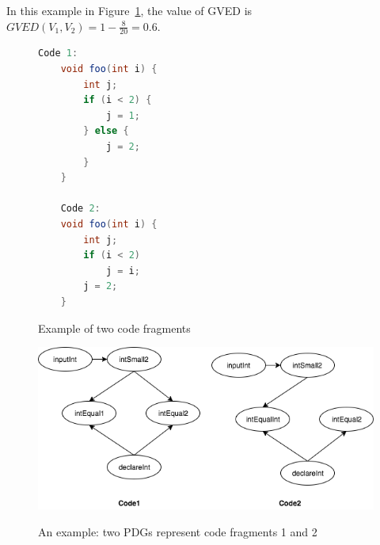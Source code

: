 In this example in Figure~\ref{code1code2}, the value of GVED is
$GVED\left(V_1, V_2\right) = 1 - \frac{8 }{20} = 0.6 $.

\begin{figure}
\begin{lstlisting}[language=JAVA]
	Code 1:
	void foo(int i) {
		int j;
		if (i < 2) {
			j = 1;
		} else {
			j = 2;
		}
	}

	Code 2:
	void foo(int i) {
		int j;
		if (i < 2)
			j = i;	
		j = 2;
	}
\end{lstlisting}
\caption{Example of two code fragments}
\label{code1code2}
\end{figure}

\begin{figure}[t]
	\caption{An example: two PDGs represent code fragments 1 and 2}
	\includegraphics[scale=0.4]{img/Diagram_PDG.png}
	\centering
	\label{fig:PDGs}
\end{figure}

\begin{table}[t]
  \centering
  \caption{Feature Table of Code Fragment 1 in Exas}
  \label{tab:feature1}%
\end{table}%

